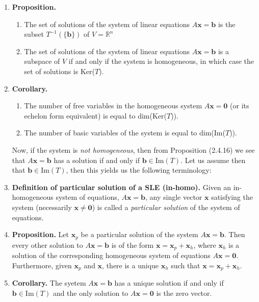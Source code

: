 \documentclass[oneside, 12pt]{book}
\newcommand{\settag}[1]{\renewcommand{\theenumi}{#1}}
\newcommand{\R}{\mathbb{R}}
\newcommand{\tbf}[1]{\textbf{#1}}
\newcommand{\tit}[1]{\textit{#1}}
\newcommand{\para}[1]{\item \tbf{#1}}
\newcommand{\vb}{\mathbf{b}}
\newcommand{\vx}{\mathbf{x}}
\newcommand{\vzero}{\mathbf{0}}
\begin{document}
\begin{enumerate}
        \settag{2.4.16}
        \para{Proposition.}
        \begin{enumerate}
            \item The set of solutions of the system of linear equations $A\vx = \vb$ is the subset $T^{-1}\left(\{\vb\}\right)$ of $V = \R^n$
            \item The set of solutions of the system of linear equations $A\vx = \vb$ is a subspace of $V$ if and only if the system is homogeneous, in which case the set of solutions is Ker($T$).
        \end{enumerate}
        
        \settag{2.4.17}
        \para{Corollary.} 
        \begin{enumerate}
            \item The number of free variables in the homogeneous system $A\vx = \vzero$ (or its echelon form equivalent) is equal to dim(Ker($T$)).
            \item The number of basic variables of the system is equal to dim(Im($T$)).
        \end{enumerate}
        Now, if the system is \tit{not homogeneous}, then from Proposition (2.4.16) we see that $A\vx = \vb$ has a solution if and only if $\vb \in \text{Im}(T)$. Let us assume then that $\vb \in \text{Im}(T)$, then this yields us the following terminology:
        
        \settag{2.4.18}
        \para{Definition of particular solution of a SLE (in-homo).} Given an in-homogeneous system of equations, $A\vx = \vb$, any single vector $\vx$ satisfying the system (necessarily $\vx \neq \vzero$) is called a \tit{particular solution} of the system of equations.
        
        \settag{2.4.19}
        \para{Proposition.} Let $\vx_p$ be a particular solution of the system $A\vx = \vb$. Then every other solution to $A\vx = \vb$ is of the form $\vx = \vx_p + \vx_h$, where $\vx_h$ is a solution of the corresponding homogeneous system of equations $A\vx = \vzero$. Furthermore, given $\vx_p$ and $\vx$, there is a unique $\vx_h$ such that $\vx = \vx_p + \vx_h$.
        
        \settag{2.4.20}
        \para{Corollary.} The syetem $A\vx = \vb$ has a unique solution if and only if $\vb \in \text{Im}(T)$ and the only solution to $A\vx = \vzero$ is the zero vector.
    \end{enumerate}
    
\end{document}
